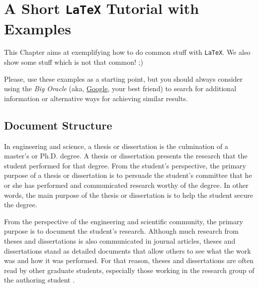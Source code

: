 \chapter{A Short \texttt{LaTeX} Tutorial with Examples}
\label{cha:a_short_latex_tutorial_with_examples}

This Chapter aims at exemplifying how to do common stuff with \texttt{LaTeX}. We also show some stuff which is not that common! ;)

Please, use these examples as a starting point, but you should always consider using the \emph{Big Oracle} (aka, \href{http://www.google.com}{Google}, your best friend) to search for additional information or alternative ways for achieving similar results.


\section{Document Structure} %
\label{sec:document_structure}

In engineering and science, a thesis or dissertation is the culmination of a master's or Ph.D. degree. A thesis or dissertation presents the research that the student performed for that degree. From the student's perspective, the primary purpose of a thesis or dissertation is to persuade the student's committee that he or she has performed and communicated research worthy of the degree. In other words, the main purpose of the thesis or dissertation is to help the student secure the degree.

From the perspective of the engineering and scientific community, the primary purpose is to document the student's research. Although much research from theses and dissertations is also communicated in journal articles, theses and dissertations stand as detailed documents that allow others to see what the work was and how it was performed. For that reason, theses and dissertations are often read by other graduate students, especially those working in the research group of the authoring student \cite{gustavii2016write, glasman2010science, chicago, strunk}.

